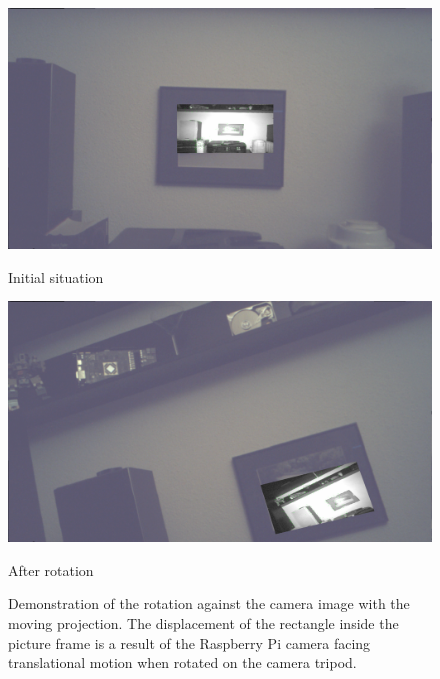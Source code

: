 \begin{figure}[H]
  \centering
  \begin{minipage}[b]{0.47\textwidth}
    \includegraphics[scale=0.1115]{images/demo_rotation_init.png}
    \caption{Initial situation}
    \label{fig:rotation_demo_init} 
  \end{minipage} %
  \begin{minipage}[b]{0.47\textwidth}
    \includegraphics[scale=0.1115]{images/demo_rotation_rotated.png} 
    \caption{After rotation}
    \label{fig:rotation_demo_rotated} 
  \end{minipage}
  \caption{Demonstration of the rotation against the camera image with the moving projection. The displacement of the rectangle inside the picture frame is a result of the Raspberry Pi camera facing translational motion when rotated on the camera tripod.}
  \label{fig:rotation_demo}
\end{figure}
